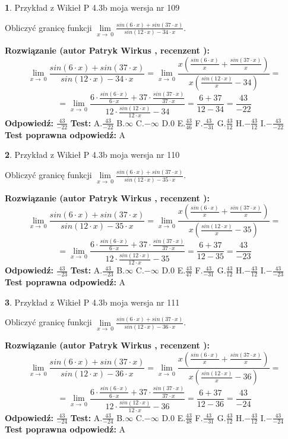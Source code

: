 \documentclass[12pt, a4paper]{article}
\theoremstyle{definition} %
\newtheorem{zad}{}
\newcommand{\zadStart}[1]{\begin{zad}#1\newline}
\newcommand{\zadStop}{\end{zad}}
\newcommand{\rozwStart}[2]{\noindent \textbf{Rozwiązanie (autor #1 , recenzent #2): }\newline}
\newcommand{\rozwStop}{\newline}
\newcommand{\odpStart}{\noindent \textbf{Odpowiedź:}\newline}
\newcommand{\odpStop}{\newline}
\newcommand{\testStart}{\noindent \textbf{Test:}\newline}
\newcommand{\testStop}{\newline}
\newcommand{\kluczStart}{\noindent \textbf{Test poprawna odpowiedź:}\newline}
\newcommand{\kluczStop}{\newline}
\begin{document}
\zadStart{Przykład z Wikieł P 4.3b moja wersja nr 109}


Obliczyć granicę funkcji $\lim\limits_{x\to\ 0}\frac{sin(6 \cdot x)+sin(37 \cdot x)}{sin(12 \cdot x)-34 \cdot x}$.
\zadStop
\rozwStart{Patryk Wirkus}{}
$$\lim\limits_{x\to\ 0}\frac{sin(6 \cdot x)+sin(37 \cdot x)}{sin(12 \cdot x)-34 \cdot x}=\lim\limits_{x\to\ 0}\frac{x(\frac{sin(6 \cdot x)}{x}+\frac{sin(37 \cdot x)}{x})}{x(\frac{sin(12 \cdot x)}{x}-34)}=$$
$$=\lim\limits_{x\to\ 0}\frac{6 \cdot \frac{sin(6 \cdot x)}{6 \cdot x}+37 \cdot \frac{sin(37 \cdot x)}{37 \cdot x}}{12 \cdot \frac{sin(12 \cdot x)}{12 \cdot x}-34}=\frac{6+37}{12-34} = \frac{43}{-22}$$
\rozwStop
\odpStart
$\frac{43}{-22}$
\odpStop
\testStart
A.$\frac{43}{-22}$
B.$\infty$
C.$-\infty$
D.$0$
E.$\frac{43}{46}$
F.$\frac{43}{-31}$
G.$\frac{43}{12}$
H.$-\frac{43}{12}$
I.$-\frac{43}{-22}$
\testStop
\kluczStart
A
\kluczStop



\zadStart{Przykład z Wikieł P 4.3b moja wersja nr 110}


Obliczyć granicę funkcji $\lim\limits_{x\to\ 0}\frac{sin(6 \cdot x)+sin(37 \cdot x)}{sin(12 \cdot x)-35 \cdot x}$.
\zadStop
\rozwStart{Patryk Wirkus}{}
$$\lim\limits_{x\to\ 0}\frac{sin(6 \cdot x)+sin(37 \cdot x)}{sin(12 \cdot x)-35 \cdot x}=\lim\limits_{x\to\ 0}\frac{x(\frac{sin(6 \cdot x)}{x}+\frac{sin(37 \cdot x)}{x})}{x(\frac{sin(12 \cdot x)}{x}-35)}=$$
$$=\lim\limits_{x\to\ 0}\frac{6 \cdot \frac{sin(6 \cdot x)}{6 \cdot x}+37 \cdot \frac{sin(37 \cdot x)}{37 \cdot x}}{12 \cdot \frac{sin(12 \cdot x)}{12 \cdot x}-35}=\frac{6+37}{12-35} = \frac{43}{-23}$$
\rozwStop
\odpStart
$\frac{43}{-23}$
\odpStop
\testStart
A.$\frac{43}{-23}$
B.$\infty$
C.$-\infty$
D.$0$
E.$\frac{43}{47}$
F.$\frac{43}{-31}$
G.$\frac{43}{12}$
H.$-\frac{43}{12}$
I.$-\frac{43}{-23}$
\testStop
\kluczStart
A
\kluczStop



\zadStart{Przykład z Wikieł P 4.3b moja wersja nr 111}


Obliczyć granicę funkcji $\lim\limits_{x\to\ 0}\frac{sin(6 \cdot x)+sin(37 \cdot x)}{sin(12 \cdot x)-36 \cdot x}$.
\zadStop
\rozwStart{Patryk Wirkus}{}
$$\lim\limits_{x\to\ 0}\frac{sin(6 \cdot x)+sin(37 \cdot x)}{sin(12 \cdot x)-36 \cdot x}=\lim\limits_{x\to\ 0}\frac{x(\frac{sin(6 \cdot x)}{x}+\frac{sin(37 \cdot x)}{x})}{x(\frac{sin(12 \cdot x)}{x}-36)}=$$
$$=\lim\limits_{x\to\ 0}\frac{6 \cdot \frac{sin(6 \cdot x)}{6 \cdot x}+37 \cdot \frac{sin(37 \cdot x)}{37 \cdot x}}{12 \cdot \frac{sin(12 \cdot x)}{12 \cdot x}-36}=\frac{6+37}{12-36} = \frac{43}{-24}$$
\rozwStop
\odpStart
$\frac{43}{-24}$
\odpStop
\testStart
A.$\frac{43}{-24}$
B.$\infty$
C.$-\infty$
D.$0$
E.$\frac{43}{48}$
F.$\frac{43}{-31}$
G.$\frac{43}{12}$
H.$-\frac{43}{12}$
I.$-\frac{43}{-24}$
\testStop
\kluczStart
A
\kluczStop
\end{document}
